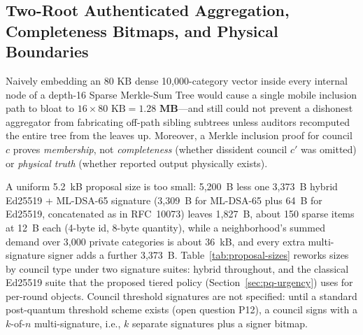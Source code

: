 \documentclass[10pt,twoside,openany]{book}
\theoremstyle{dpepstyle}
\begin{document}
\subsection{Two-Root Authenticated Aggregation, Completeness Bitmaps, and Physical Boundaries}
\label{sec:two-root}
Naively embedding an $80\text{ KB}$ dense 10,000-category vector inside every internal node of a depth-16 Sparse Merkle-Sum Tree would cause a single mobile inclusion path to bloat to $16 \times 80\text{ KB} = \mathbf{1.28\text{ MB}}$---and still could not prevent a dishonest aggregator from fabricating off-path sibling subtrees unless auditors recomputed the entire tree from the leaves up. Moreover, a Merkle inclusion proof for council $c$ proves \emph{membership}, not \emph{completeness} (whether dissident council $c'$ was omitted) or \emph{physical truth} (whether reported output physically exists).

A uniform 5.2~kB proposal size is too small: 5,200~B less one 3,373~B hybrid Ed25519 + ML-DSA-65 signature (3,309~B for ML-DSA-65 plus 64~B for Ed25519, concatenated as in RFC~10073) leaves 1,827~B, about 150 sparse items at 12~B each (4-byte id, 8-byte quantity), while a neighborhood's summed demand over 3,000 private categories is about 36~kB, and every extra multi-signature signer adds a further 3,373~B. Table~\ref{tab:proposal-sizes} reworks sizes by council type under two signature suites: hybrid throughout, and the classical Ed25519 suite that the proposed tiered policy (Section~\ref{sec:pq-urgency}) uses for per-round objects. Council threshold signatures are not specified: until a standard post-quantum threshold scheme exists (open question P12), a council signs with a $k$-of-$n$ multi-signature, i.e., $k$ separate signatures plus a signer bitmap.
\end{document}
